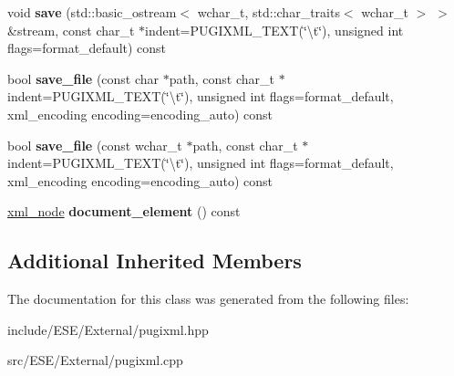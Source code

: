 \begin{DoxyCompactItemize}
\item 
\hypertarget{classpugi_1_1xml__document_ae0b377bda28c7fbac4ba50b4e3f9d211}{void {\bfseries save} (std\-::basic\-\_\-ostream$<$ wchar\-\_\-t, std\-::char\-\_\-traits$<$ wchar\-\_\-t $>$ $>$ \&stream, const char\-\_\-t $\ast$indent=P\-U\-G\-I\-X\-M\-L\-\_\-\-T\-E\-X\-T(\char`\"{}\textbackslash{}t\char`\"{}), unsigned int flags=format\-\_\-default) const }\label{classpugi_1_1xml__document_ae0b377bda28c7fbac4ba50b4e3f9d211}

\item 
\hypertarget{classpugi_1_1xml__document_ac67294573cbaa41d3e6210480a9f7f99}{bool {\bfseries save\-\_\-file} (const char $\ast$path, const char\-\_\-t $\ast$indent=P\-U\-G\-I\-X\-M\-L\-\_\-\-T\-E\-X\-T(\char`\"{}\textbackslash{}t\char`\"{}), unsigned int flags=format\-\_\-default, xml\-\_\-encoding encoding=encoding\-\_\-auto) const }\label{classpugi_1_1xml__document_ac67294573cbaa41d3e6210480a9f7f99}

\item 
\hypertarget{classpugi_1_1xml__document_a47e18cd3438eabd64fa2f82d56b08aef}{bool {\bfseries save\-\_\-file} (const wchar\-\_\-t $\ast$path, const char\-\_\-t $\ast$indent=P\-U\-G\-I\-X\-M\-L\-\_\-\-T\-E\-X\-T(\char`\"{}\textbackslash{}t\char`\"{}), unsigned int flags=format\-\_\-default, xml\-\_\-encoding encoding=encoding\-\_\-auto) const }\label{classpugi_1_1xml__document_a47e18cd3438eabd64fa2f82d56b08aef}

\item 
\hypertarget{classpugi_1_1xml__document_aa3b17a8891e2c89996ab4c7a2a6759ad}{\hyperlink{classpugi_1_1xml__node}{xml\-\_\-node} {\bfseries document\-\_\-element} () const }\label{classpugi_1_1xml__document_aa3b17a8891e2c89996ab4c7a2a6759ad}

\end{DoxyCompactItemize}
\subsection*{Additional Inherited Members}


The documentation for this class was generated from the following files\-:\begin{DoxyCompactItemize}
\item 
include/\-E\-S\-E/\-External/pugixml.\-hpp\item 
src/\-E\-S\-E/\-External/pugixml.\-cpp\end{DoxyCompactItemize}
